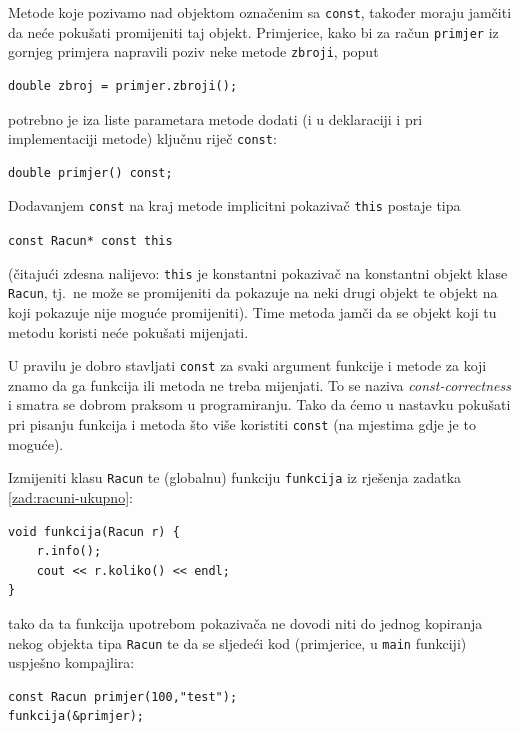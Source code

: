 Metode koje pozivamo nad objektom označenim sa \texttt{const},
također moraju jamčiti da neće pokušati promijeniti taj objekt.
Primjerice,
kako bi za račun \texttt{primjer} iz gornjeg primjera napravili poziv neke metode \texttt{zbroji}, poput
\begin{verbatim}
double zbroj = primjer.zbroji();
\end{verbatim}
potrebno je iza liste parametara metode dodati
(i u deklaraciji i pri implementaciji metode) ključnu riječ \texttt{const}:
\begin{verbatim}
double primjer() const;
\end{verbatim}
Dodavanjem \texttt{const} na kraj metode implicitni pokazivač \texttt{this} postaje tipa 
\begin{center}
    \texttt{const Racun* const this}
\end{center}
(čitajući zdesna nalijevo: \texttt{this} je konstantni
pokazivač na konstantni objekt klase \texttt{Racun}, tj.\ ne može se promijeniti da pokazuje na neki drugi objekt
te objekt na koji pokazuje nije moguće promijeniti). 
Time metoda jamči da se objekt koji tu metodu koristi neće pokušati mijenjati.


\begin{savjet}
U pravilu je dobro stavljati \texttt{const} za svaki argument
funkcije i metode za koji znamo da ga funkcija ili metoda ne treba mijenjati. 
To se naziva \textit{const-correctness} i smatra se dobrom praksom u programiranju.
Tako da ćemo u nastavku pokušati pri pisanju funkcija i metoda što više koristiti \texttt{const}
(na mjestima gdje je to moguće).
\end{savjet}


\begin{zadatak}
    Izmijeniti klasu \texttt{Racun} te (globalnu) funkciju \texttt{funkcija}
    iz rješenja zadatka \ref{zad:racuni-ukupno}:
    \begin{verbatim}
void funkcija(Racun r) {
    r.info();
    cout << r.koliko() << endl;
}
    \end{verbatim}
    tako da ta funkcija upotrebom pokazivača ne dovodi niti do jednog kopiranja
    nekog objekta tipa \texttt{Racun}
    te da se sljedeći kod (primjerice, u \texttt{main} funkciji) uspješno kompajlira:
    \begin{verbatim}
const Racun primjer(100,"test");
funkcija(&primjer);
    \end{verbatim}
\end{zadatak}


